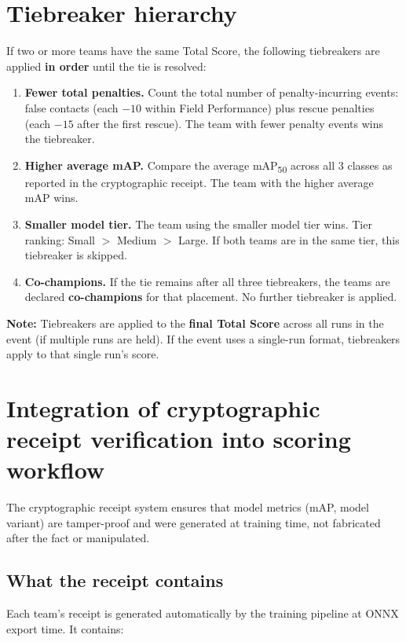 \documentclass[a4]{article}
\begin{document}
\section*{Tiebreaker hierarchy}
If two or more teams have the same Total Score, the following tiebreakers are applied \textbf{in order} until the tie is resolved:

\begin{enumerate}
    \item \textbf{Fewer total penalties.} Count the total number of penalty-incurring events: false contacts (each $-10$ within Field Performance) plus rescue penalties (each $-15$ after the first rescue). The team with fewer penalty events wins the tiebreaker.

    \item \textbf{Higher average mAP.} Compare the average mAP\textsubscript{50} across all 3 classes as reported in the cryptographic receipt. The team with the higher average mAP wins.

    \item \textbf{Smaller model tier.} The team using the smaller model tier wins. Tier ranking: Small $>$ Medium $>$ Large. If both teams are in the same tier, this tiebreaker is skipped.

    \item \textbf{Co-champions.} If the tie remains after all three tiebreakers, the teams are declared \textbf{co-champions} for that placement. No further tiebreaker is applied.
\end{enumerate}

\textbf{Note:} Tiebreakers are applied to the \textbf{final Total Score} across all runs in the event (if multiple runs are held). If the event uses a single-run format, tiebreakers apply to that single run's score.

\section*{Integration of cryptographic receipt verification into scoring workflow}
The cryptographic receipt system ensures that model metrics (mAP, model variant) are tamper-proof and were generated at training time, not fabricated after the fact or manipulated.

\subsection*{What the receipt contains}

Each team's receipt is generated automatically by the training pipeline at ONNX export time. It contains:
\end{document}
